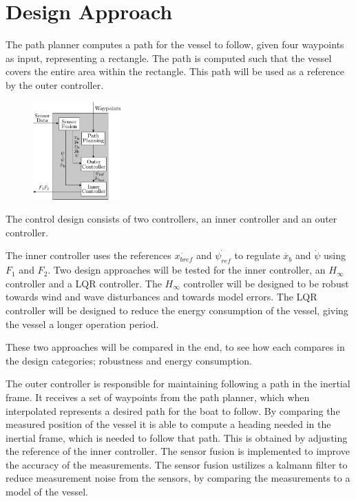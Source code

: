 \chapter{Design Approach}



The path planner computes a path for the vessel to follow, given four waypoints as input, representing a rectangle. 
The path is computed such that the vessel covers the entire area within the rectangle. 
This path will be used as a reference by the outer controller.

\begin{figure}[H]
    \includegraphics[width=0.3\textwidth]{figures/controllerDiagram}
    \caption{}
    \label{fig:controllerDiagram}
\end{figure}


The control design consists of two controllers, an inner controller and an outer controller. 

The inner controller uses the references $\dot{x_{bref}}$ and $\dot{\psi_{ref}}$ to regulate $\dot{x_{b}}$ and $\dot{\psi}$ using $F_{1}$ and $F_{2}$. 
Two design approaches will be tested for the inner controller, an $H_{\infty}$ controller and a LQR controller.
The $H_{\infty}$ controller will be designed to be robust towards wind and wave disturbances and towards model errors. 
The LQR controller will be designed to reduce the energy consumption of the vessel, giving the vessel a longer operation period. 

These two approaches will be compared in the end, to see how each compares in the design categories; robustness and energy consumption. 

The outer controller is responsible for maintaining following a path in the inertial frame. 
It receives a set of waypoints from the path planner, which when interpolated represents a desired path for the boat to follow. 
By comparing the measured position of the vessel it is able to compute a heading needed in the inertial frame, which is needed to follow that path.
This is obtained by adjusting the reference of the inner controller. 
The sensor fusion is implemented to improve the accuracy of the measurements. 
The sensor fusion ustilizes a kalmann filter to reduce measurement noise from the sensors, by comparing the measurements to a model of the vessel. 

